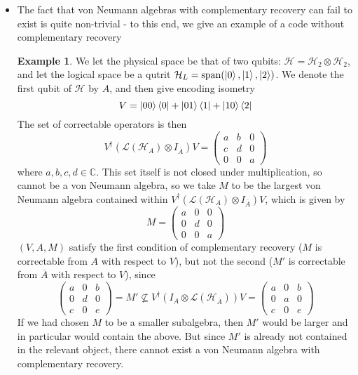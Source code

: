 \documentclass[12pt,a4paper]{article}
\numberwithin{equation}{section}
\newcommand{\ketbra}[2]{\ket{#1}\bra{#2}}
\newcommand{\ol}[1]{\overline{#1}}
\newcommand{\mdef}{V^{\dagger}(\mathcal{L}(\mathcal{H}_{A})\otimes I_{\overline{A}})V}
\theoremstyle{definition}
\theoremstyle{theorem}
\theoremstyle{example}
\newtheorem{example}{Example}[section]
\begin{document}
\begin{itemize}
		\item The fact that von Neumann algebras with complementary recovery can fail to exist is quite non-trivial - to this end, we give an example of a code without complementary recovery
		\begin{example}
			We let the physical space be that of two qubits: $\mathcal{H}=\mathcal{H}_{2}\otimes\mathcal{H}_{2}$, and let the logical space be a qutrit $\mathcal{H}_{L}=\text{span}(\ket{0},\ket{1},\ket{2})$. We denote the first qubit of $\mathcal{H}$ by $A$, and then give encoding isometry
			\begin{equation}
				V=\ketbra{00}{0}+\ketbra{01}{1}+\ketbra{10}{2}
			\end{equation}
			The set of correctable operators is then
			\begin{equation}
				\mdef=\begin{pmatrix}
					a&b&0\\c&d&0\\0&0&a
				\end{pmatrix}
			\end{equation}
			where $a,b,c,d\in\mathbb{C}$. This set itself is not closed under multiplication, so cannot be a von Neumann algebra, so we take $M$ to be the largest von Neumann algebra contained within $\mdef$, which is given by
			\begin{equation}
				M=\begin{pmatrix}
					a&0&0\\0&d&0\\0&0&a
				\end{pmatrix}
			\end{equation}
			$(V,A,M)$ satisfy the first condition of complementary recovery ($M$ is correctable from $A$ with respect to $V$), but not the second ($M'$ is correctable from $\ol{A}$ with respect to $V$), since
			\begin{equation}
				\begin{pmatrix}
					a&0&b\\0&d&0\\c&0&e
				\end{pmatrix}
				=M'\nsubseteq V^{\dagger}(I_{A}\otimes\mathcal{L}(\mathcal{H}_{\ol{A}}))V=\begin{pmatrix}
					a&0&b\\0&a&0\\c&0&e
				\end{pmatrix}
			\end{equation}
			If we had chosen $M$ to be a smaller subalgebra, then $M'$ would be larger and in particular would contain the above. But since $M'$ is already not contained in the relevant object, there cannot exist a von Neumann algebra with complementary recovery.
		\end{example}
	\end{itemize}
\end{document}
